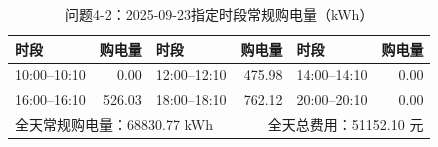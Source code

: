 \begin{table}[H]\centering\small
\caption{问题4-2：2025-09-23指定时段常规购电量（kWh）}
\label{tab:q4_2_0923_purchase}
\begin{tabular}{lrlrlr}\toprule
时段 & 购电量 & 时段 & 购电量 & 时段 & 购电量 \\\midrule
10:00--10:10 & 0.00 & 12:00--12:10 & 475.98 & 14:00--14:10 & 0.00 \\
16:00--16:10 & 526.03 & 18:00--18:10 & 762.12 & 20:00--20:10 & 0.00 \\
\midrule
\multicolumn{3}{l}{全天常规购电量：68830.77 kWh} & \multicolumn{3}{r}{全天总费用：51152.10 元}\\
\bottomrule\end{tabular}\end{table}

